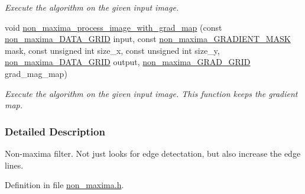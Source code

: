 \begin{DoxyCompactItemize}
\begin{DoxyCompactList}\small\item\em Execute the algorithm on the given input image. \end{DoxyCompactList}\item 
void \hyperlink{a00015_a46fba296ce8cf4724fccbb1040cfa8c3}{non\-\_\-maxima\-\_\-process\-\_\-image\-\_\-with\-\_\-grad\-\_\-map} (const \hyperlink{a00015_a5b3067f5dc305f04d5a7958013212c82}{non\-\_\-maxima\-\_\-\-D\-A\-T\-A\-\_\-\-G\-R\-I\-D} input, const \hyperlink{a00015_a7dd815a0a3b2d6f876ff33571eb2e12d}{non\-\_\-maxima\-\_\-\-G\-R\-A\-D\-I\-E\-N\-T\-\_\-\-M\-A\-S\-K} mask, const unsigned int size\-\_\-x, const unsigned int size\-\_\-y, \hyperlink{a00015_a5b3067f5dc305f04d5a7958013212c82}{non\-\_\-maxima\-\_\-\-D\-A\-T\-A\-\_\-\-G\-R\-I\-D} output, \hyperlink{a00015_ac46b96fbfbaedf0343eb3282eccb96e5}{non\-\_\-maxima\-\_\-\-G\-R\-A\-D\-\_\-\-G\-R\-I\-D} grad\-\_\-mag\-\_\-map)
\begin{DoxyCompactList}\small\item\em Execute the algorithm on the given input image. This function keeps the gradient map. \end{DoxyCompactList}\end{DoxyCompactItemize}


\subsubsection{Detailed Description}
Non-\/maxima filter. Not just looks for edge detectation, but also increase the edge lines. 

Definition in file \hyperlink{a00015_source}{non\-\_\-maxima.\-h}.



